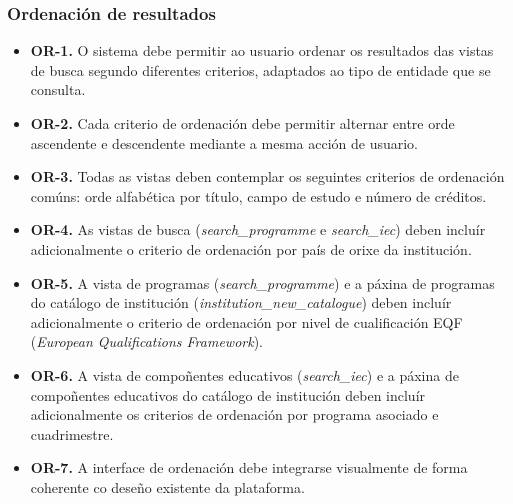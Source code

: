 \documentclass[%
    a4paper,               %
    twoside,               %
    10pt,                  %
]{article}                 %
\begin{document}
\subsubsection{Ordenación de resultados}
\label{req:sec:ordenacion}
\begin{itemize}
    \item \label{req:or1}\textbf{OR-1.} O sistema debe permitir ao usuario ordenar os resultados das vistas de busca segundo diferentes criterios, adaptados ao tipo de entidade que se consulta.

    \item \label{req:or2}\textbf{OR-2.} Cada criterio de ordenación debe permitir alternar entre orde ascendente e descendente mediante a mesma acción de usuario.

    \item \label{req:or3}\textbf{OR-3.} Todas as vistas deben contemplar os seguintes criterios de ordenación comúns: orde alfabética por título, campo de estudo e número de créditos.

    \item \label{req:or4}\textbf{OR-4.} As vistas de busca (\textit{search\_programme} e \textit{search\_iec}) deben incluír adicionalmente o criterio de ordenación por país de orixe da institución.

    \item \label{req:or5}\textbf{OR-5.} A vista de programas (\textit{search\_programme}) e a páxina de programas do catálogo de institución (\textit{institution\_new\_catalogue}) deben incluír adicionalmente o criterio de ordenación por nivel de cualificación EQF (\textit{European Qualifications Framework}).

    \item \label{req:or6}\textbf{OR-6.} A vista de compoñentes educativos (\textit{search\_iec}) e a páxina de compoñentes educativos do catálogo de institución deben incluír adicionalmente os criterios de ordenación por programa asociado e cuadrimestre.

    \item \label{req:or7}\textbf{OR-7.} A interface de ordenación debe integrarse visualmente de forma coherente co deseño existente da plataforma.
\end{itemize}

\end{document}
